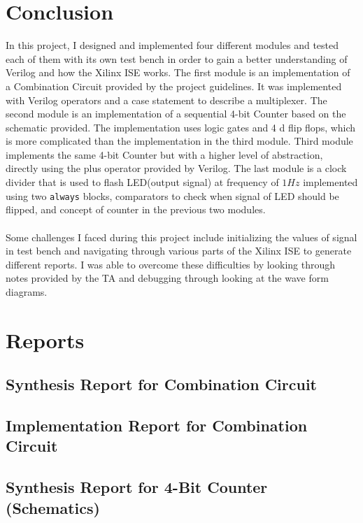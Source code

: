 \documentclass{article}
\begin{document}
\section{Conclusion} 
In this project, I designed and implemented four different modules and tested each of them with its own test bench in order to gain a better understanding of Verilog and how the Xilinx ISE works. The first module is an implementation of a Combination Circuit provided by the project guidelines. It was implemented with Verilog operators and a case statement to describe a multiplexer. The second module is an implementation of a sequential 4-bit Counter based on the schematic provided. The implementation uses logic gates and 4 d flip flops, which is more complicated than the implementation in the third module. Third module implements the same 4-bit Counter but with a higher level of abstraction, directly using the plus operator provided by Verilog. The last module is a clock divider that is used to flash LED(output signal) at frequency of $1Hz$ implemented using two \texttt{always} blocks, comparators to check when signal of LED should be flipped, and concept of counter in the previous two modules. \\ \\
Some challenges I faced during this project include initializing the values of signal in test bench and navigating through various parts of the Xilinx ISE to generate different reports. I was able to overcome these difficulties by looking through notes provided by the TA and debugging through looking at the wave form diagrams.

\newpage
\small
\section{Reports}
\subsection{Synthesis Report for Combination Circuit}

\newpage
\subsection{Implementation Report for Combination Circuit}

\newpage
\subsection{Synthesis Report for 4-Bit Counter (Schematics)}

\newpage
\end{document}
